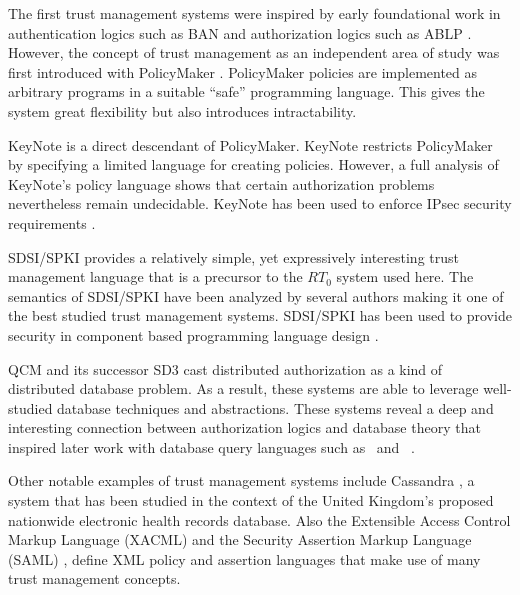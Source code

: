 
The first trust management systems were inspired by early foundational work in authentication
logics such as BAN \cite{Burrows:LA} and authorization logics such as ABLP \cite{Abadi:CACDS}.
However, the concept of trust management as an independent area of study was first introduced
with PolicyMaker \cite{Blaze:DTM,Blaze:CCPTMS}. PolicyMaker policies are implemented as
arbitrary programs in a suitable ``safe'' programming language. This gives the system great
flexibility but also introduces intractability.

KeyNote \cite{RFC-2704} is a direct descendant of PolicyMaker. KeyNote restricts PolicyMaker by
specifying a limited language for creating policies. However, a full analysis of KeyNote's
policy language \cite{Li:DCFTML} shows that certain authorization problems nevertheless remain
undecidable. KeyNote has been used to enforce IPsec security requirements
\cite{Blaze:TMIPS,Blaze:EKTMS}.

SDSI/SPKI \cite{Rivest:SDSI-11,RFC-2693} provides a relatively simple, yet expressively
interesting trust management language that is a precursor to the $RT_0$ system used here. The
semantics of SDSI/SPKI have been analyzed by several authors
\cite{Abadi:OSLLNS,Halpern:LSSLLNS,Howell:FSS,Li:LNSS,Clarke:CCDSS} making it one of the best
studied trust management systems. SDSI/SPKI has been used to provide security in component based
programming language design \cite{Liu:CSI}.

QCM \cite{Gunter:DALSI,Gunter:GCR} and its successor SD3 \cite{Jim:STMSCE,Jim:DDQE} cast
distributed authorization as a kind of distributed database problem. As a result, these systems
are able to leverage well-studied database techniques and abstractions. These systems reveal a
deep and interesting connection between authorization logics and database theory that inspired
later work with database query languages such as \datalog\ and \datalogc\ \cite{Li:DCFTML}.

Other notable examples of trust management systems include Cassandra \cite{Becker:CFTMAEHR}, a
system that has been studied in the context of the United Kingdom's proposed nationwide
electronic health records database. Also the Extensible Access Control Markup Language (XACML)
\cite{OASIS:XACMLTC} and the Security Assertion Markup Language (SAML) \cite{OASIS:SSTC}, define
XML policy and assertion languages that make use of many trust management concepts.


